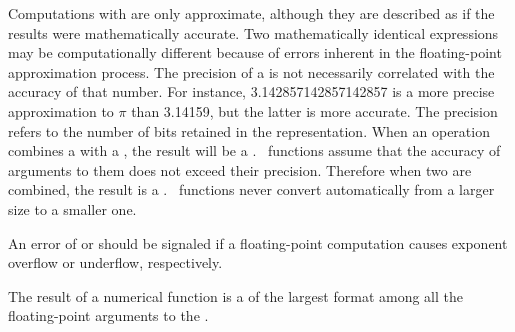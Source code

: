 \endsubsubsection%


\endsubsubsection%

Computations with  are only approximate,
although they are described as if the results
were mathematically accurate. 
Two mathematically identical
expressions may be computationally different because of errors
inherent in the floating-point approximation process.
The precision of a  is not necessarily
correlated with the accuracy of that number.
For instance, 3.142857142857142857 is a more precise approximation
to $\pi$ than 3.14159, but the latter is more accurate.
The precision refers to the number of bits retained in the representation.
When an operation combines a  with a 
,
the result will be a . 
\clisp\ functions assume that the accuracy of
arguments to them does not exceed their precision.  Therefore
when two  
are combined, the result is a . 
\clisp\ functions 
never convert automatically from a larger size to a smaller one.
\endsubsubsection%


An error of  
or  should be signaled if a 
floating-point computation causes exponent overflow or underflow, respectively.

\endsubsubsection%



The result of a numerical function is a  of the 
largest format among all the floating-point arguments to the . 

\endsubsubsection%

